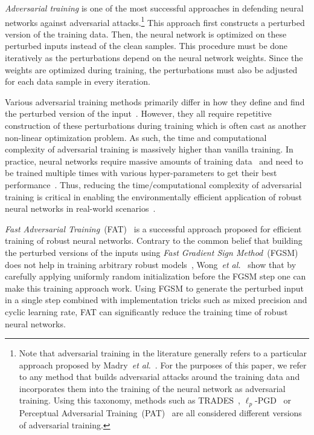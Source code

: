 \documentclass[runningheads]{llncs}
\newcommand{\etal}{\textit{et al.}}
\begin{document}
\textit{Adversarial training} is one of the most successful approaches in defending neural networks against adversarial attacks.\footnote{Note that adversarial training in the literature generally refers to a particular approach proposed by Madry~\etal~\cite{madry2018towards}.
	For the purposes of this paper, we refer to any method that builds adversarial attacks around the training data and incorporates them into the training of the neural network as adversarial training. Using this taxonomy, methods such as TRADES~\cite{zhang2019trades}, $\ell_p$-PGD~\cite{madry2018towards} or Perceptual Adversarial Training~(PAT)~\cite{laidlaw2021pat} are all considered different versions of adversarial training.}
This approach first constructs a perturbed version of the training data.
Then, the neural network is optimized on these perturbed inputs instead of the clean samples.
This procedure must be done iteratively as the perturbations depend on the neural network weights.
Since the weights are optimized during training, the perturbations must also be adjusted for each data sample in every iteration.

Various adversarial training methods primarily differ in how they define and find the perturbed version of the input~\cite{madry2018towards,zhang2019trades,laidlaw2021pat}.
However, they all require repetitive construction of these perturbations during training which is often cast as another non-linear optimization problem.
As such, the time and computational complexity of adversarial training is massively higher than vanilla training.
In practice, neural networks require massive amounts of training data~\cite{adadi2021data} and need to be trained multiple times with various hyper-parameters to get their best performance~\cite{killamsetty2021gradmatch}.
Thus, reducing the time/computational complexity of adversarial training is critical in enabling the environmentally efficient application of robust neural networks in real-world scenarios~\cite{schwartz2020greenai,strubell2019energy}.

\textit{Fast Adversarial Training}~(FAT)~\cite{wong2020fast} is a successful approach proposed for efficient training of robust neural networks.
Contrary to the common belief that building the perturbed versions of the inputs using \textit{Fast Gradient Sign Method}~(FGSM)~\cite{goodfellow2014explaining} does not help in training arbitrary robust models~\cite{tramer2018ensemble,madry2018towards}, Wong~\etal~\cite{wong2020fast} show that by carefully applying uniformly random initialization before the FGSM step one can make this training approach work.
Using FGSM to generate the perturbed input in a single step combined with implementation tricks such as mixed precision and cyclic learning rate, FAT can significantly reduce the training time of robust neural networks.
\end{document}

